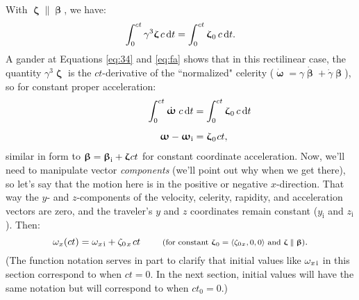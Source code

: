 \documentclass[12pt]{article}
\newcommand{\dd}[1]{\mathrm{d}#1}
\newcommand{\vvbeta}{\bm{\upbeta}}
\newcommand{\vvomega}{\bm{\upomega}}
\newcommand{\vvzeta}{\bm{\upzeta}}
\begin{document}
With $\vvzeta \parallel \vvbeta$, we have:
\begin{equation*}
\int_0^{ct} \gamma^3 \vvzeta \, c \, \dd t = \int_0^{ct} \vvzeta_{\mkern1mu 0} \, c \, \dd t .
\end{equation*}
A gander at Equations \ref{eq:34} and \ref{eq:fa} shows that in this rectilinear case, the quantity $\gamma^3 \vvzeta$ is the $ct$-derivative of the ``normalized" celerity ($\dot{\vvomega} = \gamma \dot{\vvbeta} + \dot{\gamma} \vvbeta$), so for constant proper acceleration:
\begin{equation*}
\begin{split}
\qquad \qquad \int_0^{ct} \dot{\vvomega} \; c \, \dd t &= \int_0^{ct} \vvzeta_{\mkern1mu 0} \, c \, \dd t \\[5pt]
\vvomega - \vvomega_{ \textrm{i}} &= \vvzeta_{\mkern1mu 0} \mkern1mu ct ,
\end{split}
\end{equation*}
similar in form to $\vvbeta =  \vvbeta_{\textrm{i}} + \vvzeta \mkern1mu ct$ for constant coordinate acceleration. Now, we'll need to manipulate vector \emph{components} (we'll point out why when we get there), so let's say that the motion here is in the positive or negative $x$-direction. That way the $y$- and $z$-components of the velocity, celerity, rapidity, and acceleration vectors are zero, and the traveler's $y$ and $z$ coordinates remain constant ($y_{\textrm{i}}$ and $z_{\textrm{i}}$). Then:
\begin{equation}\label{eq:ce}
\omega_x (ct) = \omega_{x \mkern2mu \textrm{i}} + \zeta_{0 \mkern2mu x} \mkern2mu ct \qquad \textrm{\footnotesize{ (for constant $\vvzeta_{\mkern1mu 0} = \langle \zeta_{0 \mkern1mu x} , 0, 0 \rangle$ and $\vvzeta \parallel \vvbeta$)}}.
\end{equation}
(The function notation serves in part to clarify that initial values like $\omega_{x \mkern2mu \textrm{i}}$ in this section correspond to when $ct = 0$. In the next section, initial values will have the same notation but will correspond to when $ct_0 = 0$.)
\end{document}
